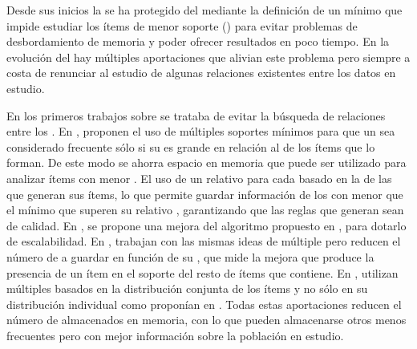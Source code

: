 \ABIERTO
Desde sus inicios la \ARM se ha protegido del \dilemaIR mediante la definición de un \soporte mínimo que impide estudiar los ítems de menor soporte (\irs) para evitar problemas de desbordamiento de memoria y poder ofrecer resultados en poco tiempo. En la evolución del \ARM hay múltiples aportaciones que alivian este problema pero siempre a costa de renunciar al estudio de algunas relaciones existentes entre los datos en estudio.

En los primeros trabajos sobre \ARM se trataba de evitar la búsqueda de relaciones entre los \irs \citep{AgrawalImielinskiSwami-MiningAssociationRulesBetweenSetsOfItemsInLargeDB-1993,AgrawalSrikant-FastAlgorithmsForMiningAssociationRules-1994,ParkChenYu-UsingAHashBasedMethod-1997}. En \cite{LiuHsuMa-ARMWithMultipleMS-1999}, proponen el uso de múltiples soportes mínimos para que un \itemset sea considerado frecuente sólo si su \soporte es grande en relación al \soporte de los ítems que lo forman. De este modo se ahorra espacio en memoria que puede ser utilizado para analizar ítems con menor \soporte. El uso de un \soporte relativo para cada \itemset basado en la \confianza de las \ars que generan sus ítems, lo que permite guardar información de los \itemsets con menor \soporte que el \soporte mínimo que superen su \soporte relativo \citep{YunHaHwangRyu-MiningAROnSignificantRareDataUsingRelativeSupport-2003}, garantizando que las reglas que generan sean de calidad. En \cite{HuChen-MiningARwithMMS-2006}, se propone una mejora del algoritmo propuesto en \cite{LiuHsuMa-ARMWithMultipleMS-1999}, para dotarlo de escalabilidad. En \cite{TsengLin-EfficientMiningOfAR-2007}, trabajan con las mismas ideas de \soporte múltiple pero reducen el número de \itemsets a guardar en función de su \lift, que mide la mejora que produce la
presencia de un ítem en el soporte del resto de ítems que contiene. En \cite{KiranReddy-ImprovedMultipleMSBasedAppMineRareAR-2009}, utilizan múltiples \soportes basados en la distribución conjunta de los ítems y no sólo en su distribución individual como proponían en \cite{LiuHsuMa-ARMWithMultipleMS-1999}. Todas estas aportaciones reducen el número de
\itemsets almacenados en memoria, con lo que pueden almacenarse otros \itemsets menos frecuentes pero con mejor información sobre la población en estudio.

